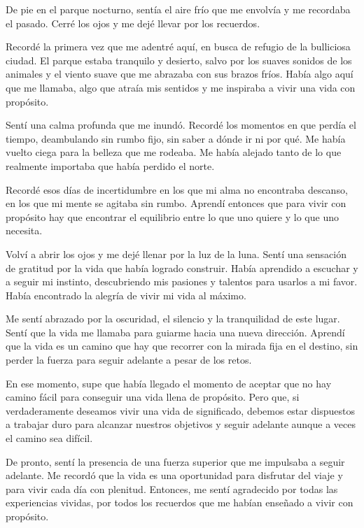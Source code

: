 

De pie en el parque nocturno, sentía el aire frío que me envolvía y me recordaba el pasado. Cerré los ojos y me dejé llevar por los recuerdos. 

Recordé la primera vez que me adentré aquí, en busca de refugio de la bulliciosa ciudad. El parque estaba tranquilo y desierto, salvo por los suaves sonidos de los animales y el viento suave que me abrazaba con sus brazos fríos. Había algo aquí que me llamaba, algo que atraía mis sentidos y me inspiraba a vivir una vida con propósito.

Sentí una calma profunda que me inundó. Recordé los momentos en que perdía el tiempo, deambulando sin rumbo fijo, sin saber a dónde ir ni por qué. Me había vuelto ciega para la belleza que me rodeaba. Me había alejado tanto de lo que realmente importaba que había perdido el norte.

Recordé esos días de incertidumbre en los que mi alma no encontraba descanso, en los que mi mente se agitaba sin rumbo. Aprendí entonces que para vivir con propósito hay que encontrar el equilibrio entre lo que uno quiere y lo que uno necesita. 

Volví a abrir los ojos y me dejé llenar por la luz de la luna. Sentí una sensación de gratitud por la vida que había logrado construir. Había aprendido a escuchar y a seguir mi instinto, descubriendo mis pasiones y talentos para usarlos a mi favor. Había encontrado la alegría de vivir mi vida al máximo.

Me sentí abrazado por la oscuridad, el silencio y la tranquilidad de este lugar. Sentí que la vida me llamaba para guiarme hacia una nueva dirección. Aprendí que la vida es un camino que hay que recorrer con la mirada fija en el destino, sin perder la fuerza para seguir adelante a pesar de los retos. 

En ese momento, supe que había llegado el momento de aceptar que no hay camino fácil para conseguir una vida llena de propósito. Pero que, si verdaderamente deseamos vivir una vida de significado, debemos estar dispuestos a trabajar duro para alcanzar nuestros objetivos y seguir adelante aunque a veces el camino sea difícil.

De pronto, sentí la presencia de una fuerza superior que me impulsaba a seguir adelante. Me recordó que la vida es una oportunidad para disfrutar del viaje y para vivir cada día con plenitud. Entonces, me sentí agradecido por todas las experiencias vividas, por todos los recuerdos que me habían enseñado a vivir con propósito.